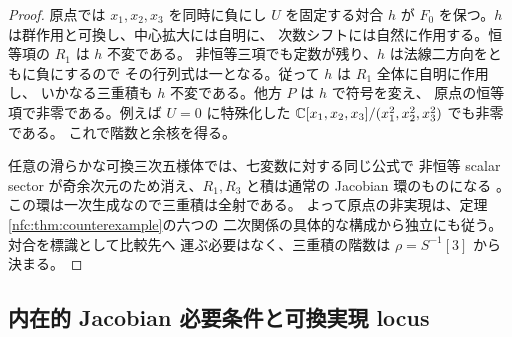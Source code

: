 \begin{proof}
原点では $x_1,x_2,x_3$ を同時に負にし $U$ を固定する対合 $h$ が
$F_0$ を保つ。$h$ は群作用と可換し、中心拡大には自明に、
次数シフトには自然に作用する。恒等項の $R_1$ は $h$ 不変である。
非恒等三項でも定数が残り、$h$ は法線二方向をともに負にするので
その行列式は一となる。従って $h$ は $R_1$ 全体に自明に作用し、
いかなる三重積も $h$ 不変である。他方 $P$ は $h$ で符号を変え、
原点の恒等項で非零である。例えば $U=0$ に特殊化した
$\mathbb C[x_1,x_2,x_3]/(x_1^2,x_2^2,x_3^2)$ でも非零である。
これで階数と余核を得る。

任意の滑らかな可換三次五様体では、七変数に対する同じ公式で
非恒等 scalar sector が奇余次元のため消え、$R_1,R_3$ と積は通常の
Jacobian 環のものになる
\cite[Theorem~3.5, Remark~3.6, Proposition~3.7]{LZ}。
この環は一次生成なので三重積は全射である。
よって原点の非実現は、定理\ref{nfc:thm:counterexample}の六つの
二次関係の具体的な構成から独立にも従う。対合を標識として比較先へ
運ぶ必要はなく、三重積の階数は $\rho=S^{-1}[3]$ から決まる。
\end{proof}


\subsection{内在的 Jacobian 必要条件と可換実現 locus}
\label{nft:sec:intrinsic-criterion}

